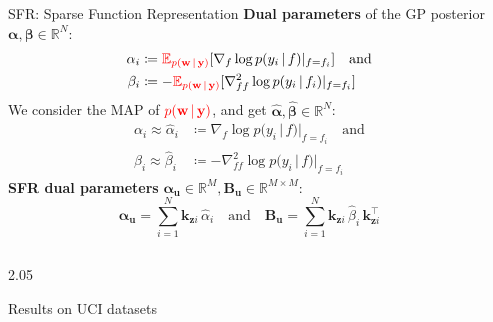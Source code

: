 \documentclass[final,12pt]{beamer}
\newcommand{\mathbold}[1]{\bm{#1}}
\newcommand{\mbf}[1]{\mathbf{#1}}
\renewcommand{\mid}{\,|\,}
\newcommand{\weights}{\ensuremath{\mathbf{w}}}
\newcommand{\T}{\top}
\newcommand{\valpha}[0]{\mathbold{\alpha}}
\newcommand{\vbeta}[0]{\mathbold{\beta}}
\newcommand{\MBeta}[0]{\mathbold{B}}
\newcommand{\vu}{\mbf{u}}
\newcommand{\vy}{\mbf{y}}
\newcommand{\vw}{\mbf{w}}
\newcommand{\vkzi}{\mbf{k}_{\mbf{z}i}}
\newcommand{\R}{\mathbb{R}}
\newcommand{\myexpect}{\mathbb{E}}
\newlength{\sepwidth}
\newlength{\colwidth}
\newcommand{\separatorcolumn}{\begin{column}{\sepwidth}\end{column}}
\renewcommand{\mid}[0]{\,|\,}
\begin{document}
\begin{frame}[t]
\begin{columns}[t]
\begin{column}{\colwidth}
\begin{block}{SFR: Sparse Function Representation}
\alert{\bf Dual parameters} of the GP posterior $\valpha, \vbeta \in \R^{N}$:
\begin{align}
  \alpha_i &\coloneqq {\color{red}{\myexpect_{p(\vw \mid \vy)}}}[\nabla_{f}\log p(y_i \mid f) |_{f=f_i}] 
  \quad \text{and} \\
  \beta_i &\coloneqq - {\color{red}{\myexpect_{p(\vw \mid \vy)}}}[\nabla^2_{f f}\log p(y_i \mid f_i) |_{f=f_i}]
\end{align}
We consider the MAP of ${\color{red}{p(\vw \mid \vy)}}$,
and get $\hat{\valpha}, \hat{\vbeta} \in \R^{N}$: 
\begin{align}
  \alpha_i \approx \hat{\alpha}_i &\coloneqq %
  \nabla_{f}\log p(y_i \mid f) |_{f=f_i}
  \quad \text{and} \\
  \beta_i \approx \hat{\beta}_i &\coloneqq - 
  \nabla^2_{ff}\log p(y_i \mid f) |_{f=f_i}
\end{align}
\alert{\bf SFR dual parameters} $\valpha_{\vu} \in \R^M, \MBeta_{\vu} \in \R^{M \times M}$: 
\begin{equation}
\valpha_{\vu}  =  \sum_{i=1}^N  \vkzi \, \hat{\alpha}_{i} %
\quad \text{and} \quad
  \MBeta_{\vu} =  \sum_{i=1}^N \vkzi \,\hat{\beta}_{i} \, \vkzi^{\T} %
\end{equation}

\end{block}
\end{column}

\separatorcolumn
\end{columns}
\vspace{-1cm}
\begin{columns}
\begin{column}{2.05\colwidth}
\begin{block}{Results on UCI datasets}


\end{block}
\end{column}
\end{columns}
\end{frame}
\end{document}
